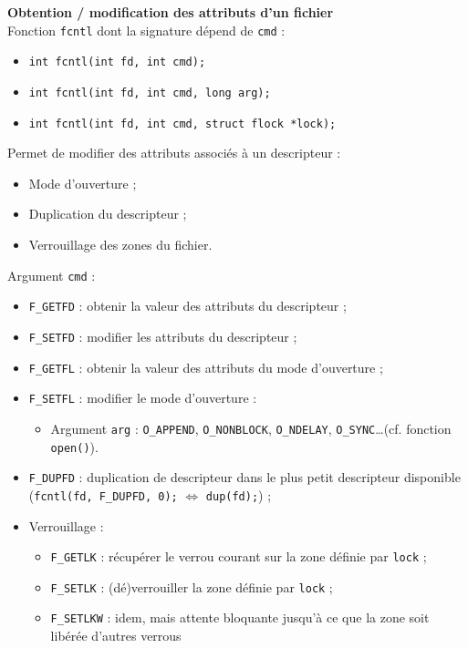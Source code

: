 \documentclass[french]{scrartcl}
\begin{document}
\begin{multicols}{3}
\vskip 5pt
\textbf{Obtention / modification des attributs d'un fichier}\\
Fonction \lstinline!fcntl! dont la signature dépend de \lstinline!cmd! :\\
\begin{itemize}
	\item \lstinline!int fcntl(int fd, int cmd);!
	\item \lstinline!int fcntl(int fd, int cmd, long arg);!
	\item \lstinline!int fcntl(int fd, int cmd, struct flock *lock);!
\end{itemize}
Permet de modifier des attributs associés à un descripteur :\begin{itemize}
	\item Mode d'ouverture ;
	\item Duplication du descripteur ;
	\item Verrouillage des zones du fichier.
\end{itemize}
Argument \lstinline!cmd! :\begin{itemize}
	\item \lstinline!F_GETFD! : obtenir la valeur des attributs du descripteur ;
	\item \lstinline!F_SETFD! : modifier les attributs du descripteur ;
	\item \lstinline!F_GETFL! : obtenir la valeur des attributs du mode d'ouverture ;
	\item \lstinline!F_SETFL! : modifier le mode d'ouverture :\begin{itemize}
		\item Argument \lstinline!arg! : \lstinline!O_APPEND!, \lstinline!O_NONBLOCK!, \lstinline!O_NDELAY!, \lstinline!O_SYNC!\dots (cf. fonction \lstinline!open()!).
	\end{itemize}
	\item \lstinline!F_DUPFD! : duplication de descripteur dans le plus petit descripteur disponible (\lstinline!fcntl(fd, F_DUPFD, 0);! $\Leftrightarrow$ \lstinline!dup(fd);!) ;
	\item Verrouillage : \begin{itemize}
		\item \lstinline!F_GETLK! : récupérer le verrou courant sur la zone définie par \lstinline!lock! ;
		\item \lstinline!F_SETLK! : (dé)verrouiller la zone définie par \lstinline!lock! ;
		\item \lstinline!F_SETLKW! : idem, mais attente bloquante jusqu'à ce que la zone soit libérée d'autres verrous

\end{itemize}
\end{itemize}
\end{multicols}
\end{document}
